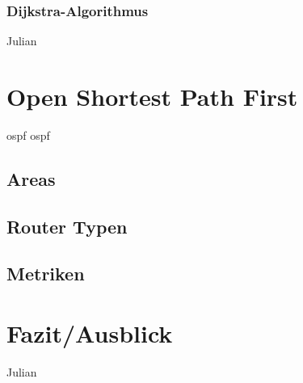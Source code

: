 \documentclass[1pt,a4paper,final]{article}
\begin{document}
\subsubsection{Dijkstra-Algorithmus}
Julian
\section{Open Shortest Path First}
\ac{ospf} \ac{ospf}
\subsection{Areas}
\subsection{Router Typen}
\subsection{Metriken}
\section{Fazit/Ausblick}
Julian

\clearpage
\nocite{*}
\printbibliography
\end{document}
